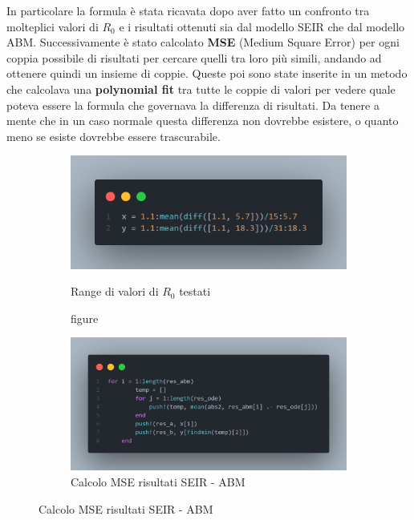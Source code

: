 In particolare la formula è stata ricavata dopo aver fatto un confronto tra molteplici 
valori di $R_0$ e i risultati ottenuti sia dal modello SEIR che dal modello ABM. 
Successivamente è stato calcolato \textbf{MSE} (Medium Square Error) per ogni coppia possibile
di risultati per cercare quelli tra loro più simili, andando ad ottenere quindi un insieme
di coppie. Queste poi sono state inserite in un metodo che calcolava una \textbf{polynomial fit} \cite{wiki:Polynomial_regression}
tra tutte le coppie di valori per vedere quale poteva essere la formula che governava la differenza 
di risultati. Da tenere a mente che in un caso normale questa differenza non dovrebbe esistere, 
o quanto meno se esiste dovrebbe essere trascurabile.

\begin{figure}[!hb]
	\centering
	\begin{subfigure}[b]{0.45\textwidth}
		\centering
		\includegraphics[width=\textwidth]{img/r0_range_test.png}
    	\caption{figure}{Range di valori di $R_0$ testati}
    	\label{fig:r0_range_test}
	\end{subfigure}
	\hfill
	\begin{subfigure}[b]{0.45\textwidth}
		\centering
		\includegraphics[width=\textwidth]{img/mse_r0.png}
		\caption{Calcolo MSE risultati SEIR - ABM}
		\label{fig:mse_r0}
	\end{subfigure}
\end{figure}

